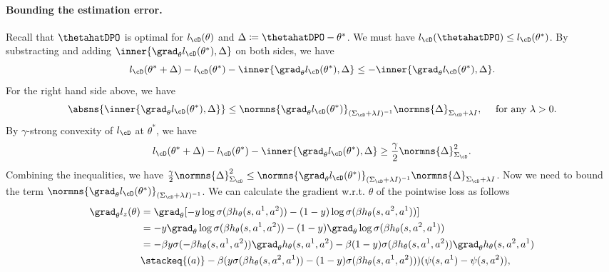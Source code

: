 \paragraph{Bounding the estimation error.} Recall that $\thetahatDPO$ is optimal for $l_{\cD}(\theta)$ and $\Delta\coloneqq \thetahatDPO - \theta^*$. We must have $l_{\cD}(\thetahatDPO)\leq l_{\cD}(\theta^*)$. By substracting and adding $\inner{\grad_\theta l_{\cD}(\theta^*),\Delta}$ on both sides, we have
\begin{equation*}
     l_{\cD}(\theta^*+\Delta) - l_{\cD}(\theta^*) - \inner{\grad_\theta l_{\cD}(\theta^*),\Delta} \leq -\inner{\grad_\theta l_{\cD}(\theta^*),\Delta}.
\end{equation*}
For the right hand side above, we have 
\begin{equation*}
     \absns{\inner{\grad_\theta l_{\cD}(\theta^*),\Delta}} \leq \normns{\grad_\theta l_{\cD}(\theta^*)}_{(\Sigma_{\cD}+\lambda I)^{-1}}\normns{\Delta}_{\Sigma_{\cD}+\lambda I}, \quad \text{ for any } \lambda > 0.
\end{equation*}
By $\gamma$-strong convexity of $l_{\cD}$ at $\theta^*$, we have
\begin{equation*}
     l_{\cD}(\theta^*+\Delta) - l_{\cD}(\theta^*) - \inner{\grad_\theta l_{\cD}(\theta^*), \Delta} \geq \frac{\gamma}{2}\normns{\Delta}^2_{\Sigma_{\cD}}.
\end{equation*}
Combining the inequalities, we have $\frac{\gamma}{2}\normns{\Delta}^2_{\Sigma_{\cD}} \leq \normns{\grad_\theta l_{\cD}(\theta^*)}_{(\Sigma_{\cD}+\lambda I)^{-1}}\normns{\Delta}_{\Sigma_{\cD}+\lambda I}$. Now we need to bound the term $\normns{\grad_\theta l_{\cD}(\theta^*)}_{(\Sigma_{\cD}+\lambda I)^{-1}}$. We can calculate the gradient w.r.t. $\theta$ of the pointwise loss as follows
\begin{align*}
    \grad_\theta l_z(\theta) &= \grad_\theta [-y \log\sigma(\beta h_\theta(s,a^1,a^2)) - (1-y) \log\sigma(\beta h_\theta(s,a^2,a^1))] \\
    &= -y\grad_\theta \log\sigma(\beta h_\theta(s,a^1,a^2)) - (1-y)\grad_\theta \log\sigma(\beta h_\theta(s,a^2,a^1)) \\
    &= -\beta y\sigma(-\beta h_\theta(s,a^1,a^2))\grad_\theta h_\theta(s,a^1,a^2) - \beta(1-y)\sigma(\beta h_\theta(s,a^1,a^2))\grad_\theta h_\theta(s,a^2,a^1) \\
    &\stackeq{(a)} -\beta(y\sigma(\beta h_\theta(s,a^2,a^1)) - (1-y)\sigma(\beta h_\theta(s,a^1,a^2))) (\psi(s,a^1)-\psi(s,a^2)),
\end{align*}
